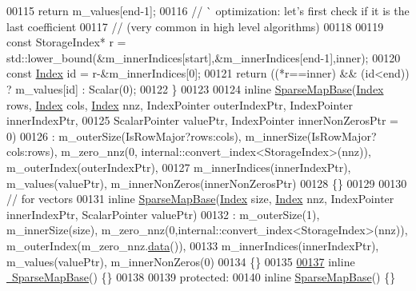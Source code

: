 \begin{DoxyCode}
00115         \textcolor{keywordflow}{return} m\_values[end-1];
00116       \textcolor{comment}{// ^^  optimization: let's first check if it is the last coefficient}
00117       \textcolor{comment}{// (very common in high level algorithms)}
00118 
00119       \textcolor{keyword}{const} StorageIndex* r = std::lower\_bound(&m\_innerIndices[start],&m\_innerIndices[end-1],inner);
00120       \textcolor{keyword}{const} \hyperlink{group___core___module_a554f30542cc2316add4b1ea0a492ff02}{Index} \textcolor{keywordtype}{id} = r-&m\_innerIndices[0];
00121       \textcolor{keywordflow}{return} ((*r==inner) && (\textcolor{keywordtype}{id}<end)) ? m\_values[id] : Scalar(0);
00122     \}
00123 
00124     \textcolor{keyword}{inline} \hyperlink{class_eigen_1_1_sparse_map_base}{SparseMapBase}(\hyperlink{group___core___module_a554f30542cc2316add4b1ea0a492ff02}{Index} rows, \hyperlink{group___core___module_a554f30542cc2316add4b1ea0a492ff02}{Index} cols, \hyperlink{group___core___module_a554f30542cc2316add4b1ea0a492ff02}{Index} nnz, IndexPointer 
      outerIndexPtr, IndexPointer innerIndexPtr,
00125                               ScalarPointer valuePtr, IndexPointer innerNonZerosPtr = 0)
00126       : m\_outerSize(IsRowMajor?rows:cols), m\_innerSize(IsRowMajor?cols:rows), m\_zero\_nnz(0,
      internal::convert\_index<StorageIndex>(nnz)), m\_outerIndex(outerIndexPtr),
00127         m\_innerIndices(innerIndexPtr), m\_values(valuePtr), m\_innerNonZeros(innerNonZerosPtr)
00128     \{\}
00129 
00130     \textcolor{comment}{// for vectors}
00131     \textcolor{keyword}{inline} \hyperlink{class_eigen_1_1_sparse_map_base}{SparseMapBase}(\hyperlink{group___core___module_a554f30542cc2316add4b1ea0a492ff02}{Index} size, \hyperlink{group___core___module_a554f30542cc2316add4b1ea0a492ff02}{Index} nnz, IndexPointer innerIndexPtr, 
      ScalarPointer valuePtr)
00132       : m\_outerSize(1), m\_innerSize(size), m\_zero\_nnz(0,internal::convert\_index<StorageIndex>(nnz)), 
      m\_outerIndex(m\_zero\_nnz.\hyperlink{class_eigen_1_1_plain_object_base_ac25699535374b1854cf8494e44ad31b2}{data}()),
00133         m\_innerIndices(innerIndexPtr), m\_values(valuePtr), m\_innerNonZeros(0)
00134     \{\}
00135 
\hyperlink{group___sparse_core___module_ab375aedf824909a7f1a6af24ee60d70f}{00137}     \textcolor{keyword}{inline} \hyperlink{group___sparse_core___module_ab375aedf824909a7f1a6af24ee60d70f}{~SparseMapBase}() \{\}
00138 
00139   \textcolor{keyword}{protected}:
00140     \textcolor{keyword}{inline} \hyperlink{class_eigen_1_1_sparse_map_base}{SparseMapBase}() \{\}

\end{DoxyCode}

